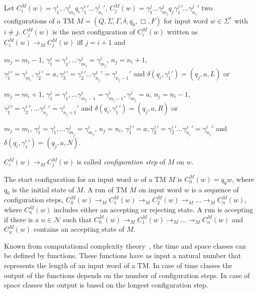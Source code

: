 \begin{definition}
    Let $C_i^M(w) = \gamma_1^i\dots\gamma_{m_i}^i{q_i}{\gamma_1^i}'\dots{\gamma_{n_i}^i}'$, $C_j^M(w) =
    \gamma_1^j\dots\gamma_{m_j}^j{q_j}{\gamma_1^j}'\dots{\gamma_{n_j}^j}'$ two configurations of a TM $M = (Q, \Sigma,
    \Gamma,
    \delta, q_0, \Box, F)$ for input word $w \in \Sigma^*$ with $i \neq j$. $C_j^M(w)$ is the next configuration
    of $C_i^M(w)$ written as $C_i^M(w) \rightarrow_M C_j^M(w)$ iff $j = i + 1$ and
    \begin{compactitem}
        \item $m_j = m_i - 1$, $\gamma_1^j = \gamma_1^i, \dots \gamma_{m_j}^j = \gamma_{m_j}^i$, $n_j = n_i + 1$,
        ${\gamma_1^j}' = \gamma_{m_i}^i, {\gamma_2^j}' = a, {\gamma_3^j}' = {\gamma_2^i}' \dots {\gamma_{n_j}^j}' =
        {\gamma_{{n_j}- 1}^i}'$ and $\delta(q_i, {\gamma_1^i}') = (q_j, a, L)$ or
        \item $m_j = m_i + 1$, $\gamma_1^j = \gamma_1^i, \dots \gamma_{m_j-1}^j = \gamma_{m_j-1}^i, \gamma_{m_j}^j
        = a$, $n_j = n_i - 1$, ${\gamma_1^j}' = {\gamma_2^i}', \dots {\gamma_{n_j}^j}' = {\gamma_{{n_j}+1}^i}'$ and
$\delta (q_i, {\gamma_1^i}') = (q_j, a, R)$ or
        \item $m_j = m_i$, $\gamma_1^j = \gamma_1^i, \dots \gamma_{m_j}^j = \gamma_{m_j}^i$, $n_j = n_i$, ${\gamma_1^j}'
= a, {\gamma_2^j}' = {\gamma_2^i}' \dots {\gamma_{n_j}^j}' = {\gamma_{n_j}^i}'$ and $\delta
        (q_i, {\gamma_1^i}') = (q_j, a, N)$.
    \end{compactitem}
    $C_i^M(w) \rightarrow_M C_j^M(w)$ is called \emph{configuration step} of $M$ on $w$.
\end{definition}

The start configuration for an input word $w$ of a TM $M$ is $C_0^M(w) = q_0w$, where $q_0$ is the initial state of
$M$. A run of TM $M$ on input word $w$ is a sequence of configuration steps, $C_0^M(w) \rightarrow_M C_1^M(w)
\rightarrow_M C_2^M(w) \rightarrow_M \dots \rightarrow_M C_n^M(w)$, where $C_n^M(w)$ includes either an accepting or
rejecting state. A run is accepting if there is a $n \in \mathcal{N}$ such that $C_0^M(w) \rightarrow_M C_1^M(w)
\rightarrow_M \dots \rightarrow_M C_n^M(w)$ and $C_n^M(w)$ contains an accepting state of $M$.

Known from computational complexity theory~\cite{papadimitriou1994complexity}, the time and space classes
can be defined by functions. These functions have as input a natural number that represents the length of an input
word of a TM. In case of time classes the output of the functions depends on the number of configuration steps. In
case of space classes the output is based on the longest configuration step.

